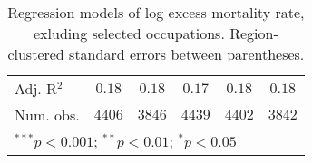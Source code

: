\begin{table}
\begin{center}
\begin{tabular}{l c c c c c}
Adj. R$^2$           & $0.18$        & $0.18$        & $0.17$        & $0.18$        & $0.18$        \\
Num. obs.            & $4406$        & $3846$        & $4439$        & $4402$        & $3842$        \\
\hline
\multicolumn{6}{l}{\scriptsize{$^{***}p<0.001$; $^{**}p<0.01$; $^{*}p<0.05$}}
\end{tabular}
\caption{Regression models of log excess mortality rate, exluding selected occupations. Region-clustered standard errors between parentheses.}
\label{tab:altoccmodels}
\end{center}
\end{table}
